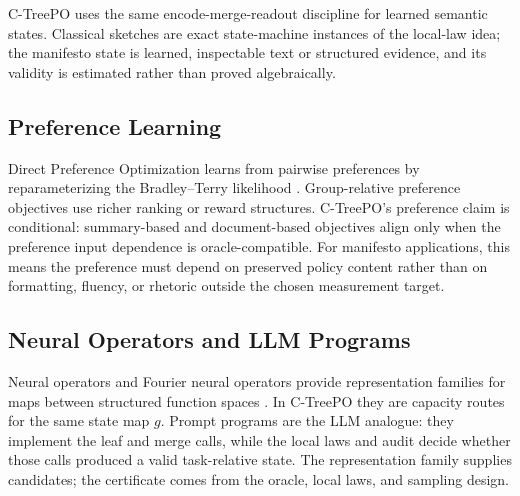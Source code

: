 C-TreePO uses the same encode-merge-readout discipline for learned
semantic states. Classical sketches are exact state-machine
instances of the local-law idea; the manifesto state is learned,
inspectable text or structured evidence, and its validity is
estimated rather than proved algebraically.

\subsection{Preference Learning}

Direct Preference Optimization learns from pairwise preferences by
reparameterizing the Bradley--Terry likelihood
\citep{BradleyTerry1952,RafailovEtAl2023DPO}. Group-relative preference
objectives use richer ranking or reward structures. C-TreePO's preference
claim is conditional: summary-based and document-based objectives align only
when the preference input dependence is oracle-compatible. For manifesto
applications, this means the preference must depend on preserved policy
content rather than on formatting, fluency, or rhetoric outside the chosen
measurement target.

\subsection{Neural Operators and LLM Programs}

Neural operators and Fourier neural operators provide representation families
for maps between structured function spaces
\citep{Kovachki23NeuralOperator,Li21FNO}. In C-TreePO they are capacity
routes for the same state map \(g\). Prompt programs are the LLM analogue:
they implement the leaf and merge calls, while the local laws and audit decide
whether those calls produced a valid task-relative state. The representation
family supplies candidates; the certificate comes from the oracle, local laws,
and sampling design.
